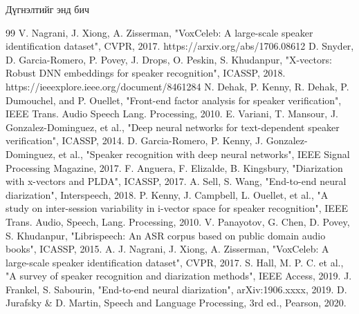 \documentclass[12pt,A4]{report}
\begin{document}
Дүгнэлтийг энд бич


	\singlespace
	\begin{thebibliography}{99}
	 V. Nagrani, J. Xiong, A. Zisserman, "VoxCeleb: A large-scale speaker identification dataset", CVPR, 2017. https://arxiv.org/abs/1706.08612
	 D. Snyder, D. Garcia-Romero, P. Povey, J. Drops, O. Peskin, S. Khudanpur, "X-vectors: Robust DNN embeddings for speaker recognition", ICASSP, 2018. https://ieeexplore.ieee.org/document/8461284
	 N. Dehak, P. Kenny, R. Dehak, P. Dumouchel, and P. Ouellet, "Front-end factor analysis for speaker verification", IEEE Trans. Audio Speech Lang. Processing, 2010.
	 E. Variani, T. Mansour, J. Gonzalez-Dominguez, et al., "Deep neural networks for text-dependent speaker verification", ICASSP, 2014.
	 D. Garcia-Romero, P. Kenny, J. Gonzalez-Dominguez, et al., "Speaker recognition with deep neural networks", IEEE Signal Processing Magazine, 2017.
	 F. Anguera, F. Elizalde, B. Kingsbury, "Diarization with x-vectors and PLDA", ICASSP, 2017.
	 A. Sell, S. Wang, "End-to-end neural diarization", Interspeech, 2018.
	 P. Kenny, J. Campbell, L. Ouellet, et al., "A study on inter-session variability in i-vector space for speaker recognition", IEEE Trans. Audio, Speech, Lang. Processing, 2010.
	 V. Panayotov, G. Chen, D. Povey, S. Khudanpur, "Librispeech: An ASR corpus based on public domain audio books", ICASSP, 2015.
	 A. J. Nagrani, J. Xiong, A. Zisserman, "VoxCeleb: A large-scale speaker identification dataset", CVPR, 2017.
	 S. Hall, M. P. C. et al., "A survey of speaker recognition and diarization methods", IEEE Access, 2019.
	 J. Frankel, S. Sabourin, "End-to-end neural diarization", arXiv:1906.xxxx, 2019.
	 D. Jurafsky & D. Martin, Speech and Language Processing, 3rd ed., Pearson, 2020.
	\end{thebibliography}
\end{document}

